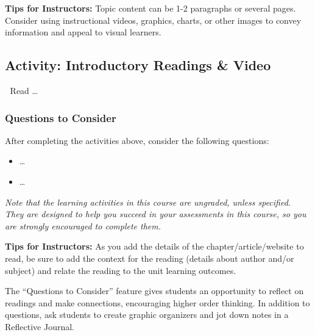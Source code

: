 \documentclass[
]{book}
\providecommand{\tightlist}{%
  \setlength{\itemsep}{0pt}\setlength{\parskip}{0pt}}
\begin{document}
\begin{feedback}
\textbf{Tips for Instructors:} Topic content can be 1-2 paragraphs or several pages. Consider using instructional videos, graphics, charts, or other images to convey information and appeal to visual learners.
\end{feedback}

\hypertarget{activity-introductory-readings-video}{%
\subsection*{Activity: Introductory Readings \& Video}\label{activity-introductory-readings-video}}

\begin{reflect}
📗 Read \ldots{}

\hypertarget{questions-to-consider}{%
\subsubsection*{Questions to Consider}\label{questions-to-consider}}

After completing the activities above, consider the following questions:

\begin{itemize}
\tightlist
\item
  \ldots{}\\
\item
  \ldots{}
\end{itemize}
\end{reflect}

\emph{Note that the learning activities in this course are ungraded, unless specified. They are designed to help you succeed in your assessments in this course, so you are strongly encouraged to complete them.}

\begin{feedback}
\textbf{Tips for Instructors:}
As you add the details of the chapter/article/website to read, be sure to add the context for the reading (details about author and/or subject) and relate the reading to the unit learning outcomes.

The ``Questions to Consider'' feature gives students an opportunity to reflect on readings and make connections, encouraging higher order thinking. In addition to questions, ask students to create graphic organizers and jot down notes in a Reflective Journal.
\end{feedback}
\end{document}
